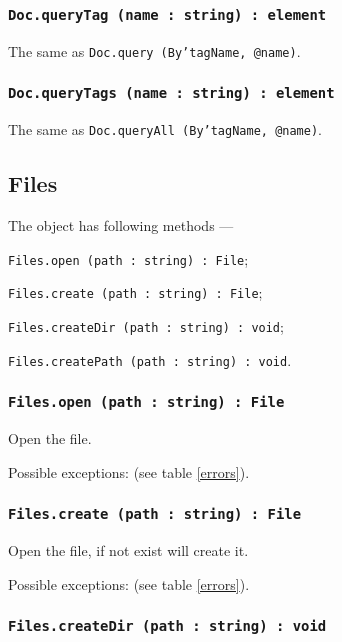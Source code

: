 \subsubsection{\texttt{Doc.queryTag (name : string) : element}}

The same as \texttt{Doc.query (By'tagName, @name)}.

\subsubsection{\texttt{Doc.queryTags (name : string) : element}}

The same as \texttt{Doc.queryAll (By'tagName, @name)}.

\subsection{{\color{orange} Files}}

The object \files{} has following methods —
\begin{icItems}
	\item \texttt{Files.open (path : string) : File};
	\item \texttt{Files.create (path : string) : File};
	\item \texttt{Files.createDir (path : string) : void};
	\item \texttt{Files.createPath (path : string) : void}.
\end{icItems}

\subsubsection{\texttt{Files.open (path : string) : File}}

Open the file.

Possible exceptions:  (see table \ref{errors}).

\subsubsection{\texttt{Files.create (path : string) : File}}

Open the file, if not exist will create it.

Possible exceptions:  (see table \ref{errors}).

\subsubsection{\texttt{Files.createDir (path : string) : void}}

